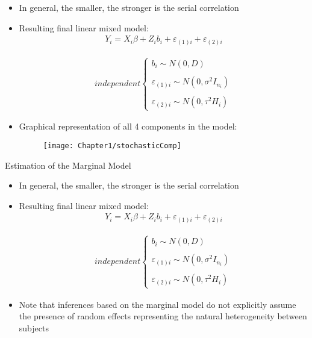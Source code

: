 \documentclass{beamer}
\begin{document}
\begin{frame}
\begin{itemize}
\item In general, the smaller, the stronger is the serial correlation
\item Resulting final linear mixed model:
\begin{eqnarray*}
Y_{i} = X_i\beta +Z_ib_i+\varepsilon_{(1)i}+\varepsilon_{(2)i}
\end{eqnarray*}

\begin{eqnarray*}
independent\left\{\begin{array}{l}
b_i\sim N(0,D)\\\\
\varepsilon_{(1)i} \sim N(0, \sigma^2I_{n_i})\\\\
\varepsilon_{(2)i} \sim N(0, \tau^2H_i)
\end{array}\right.
\end{eqnarray*}
\end{itemize}
\end{frame}

\begin{frame}
\begin{itemize}
\item Graphical representation of all 4 components in the model:
\begin{figure}[h!]
\centering
\texttt{[image: Chapter1/stochasticComp]}
\end{figure}
\end{itemize}
\end{frame}


\begin{frame}{Estimation of the Marginal Model}
\begin{itemize}
	\item In general, the smaller, the stronger is the serial correlation
	\item Resulting final linear mixed model:
	\begin{eqnarray*}
		Y_{i} = X_i\beta +Z_ib_i+\varepsilon_{(1)i}+\varepsilon_{(2)i}
	\end{eqnarray*}
	
	\begin{eqnarray*}
		independent\left\{\begin{array}{l}
			b_i\sim N(0,D)\\\\
			\varepsilon_{(1)i} \sim N(0, \sigma^2I_{n_i})\\\\
			\varepsilon_{(2)i} \sim N(0, \tau^2H_i)
		\end{array}\right.
	\end{eqnarray*}
\item Note that inferences based on the marginal model do not explicitly assume the presence of random effects representing the natural heterogeneity between subjects
\end{itemize}
\end{frame}
\end{document}
